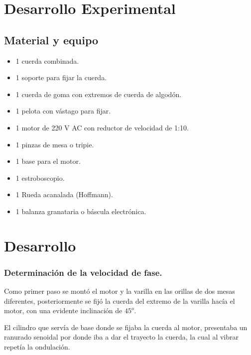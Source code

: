 \documentclass[11pt]{article}
\begin{document}
\begin{multicols}{2}
\begin{itemize}
						\end{itemize}

\section{Desarrollo Experimental}

		\subsection{Material y equipo}

			\begin{itemize}

				\item 1 cuerda combinada.	
				\item 1 soporte para fijar la cuerda.
				\item 1 cuerda de goma con extremos de cuerda de algodón.
				\item 1 pelota con vástago para fijar.
				\item 1 motor de 220 V AC con reductor de velocidad de 1:10.
				\item 1 pinzas de mesa o tripie.
				\item 1 base para el motor.	
				\item 1 estroboscopio.
				\item 1 Rueda acanalada (Hoffmann).
				\item 1 balanza granataria o báscula electrónica.

			\end{itemize}

		\section{Desarrollo}

				\subsubsection{Determinación de la velocidad de fase.}

					Como primer paso se montó el motor y la varilla en las orillas de dos mesas diferentes, posteriormente se fijó la cuerda del extremo de la varilla hacía el motor, con una evidente inclinación de $45^o$.

					El cilindro que servía de base donde se fijaba la cuerda al motor, presentaba un ranurado senoidal por donde iba a dar el trayecto la cuerda, la cual al vibrar repetía la ondulación.


\end{multicols}
\end{document}
